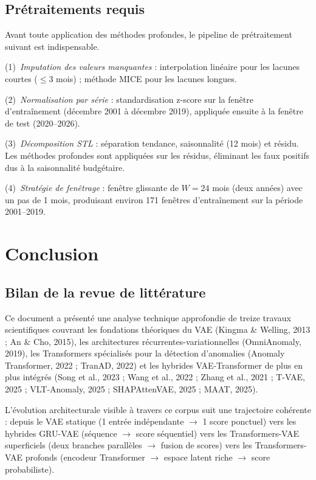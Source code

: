 \documentclass[12pt,a4paper]{article}
\begin{document}
\subsection{Prétraitements requis}

Avant toute application des méthodes profondes, le pipeline de prétraitement suivant est indispensable.

(1)~\textit{Imputation des valeurs manquantes} : interpolation linéaire pour les lacunes courtes ($\leq 3$ mois) ; méthode MICE pour les lacunes longues.

(2)~\textit{Normalisation par série} : standardisation z-score sur la fenêtre d'entraînement (décembre 2001 à décembre 2019), appliquée ensuite à la fenêtre de test (2020--2026).

(3)~\textit{Décomposition STL} : séparation tendance, saisonnalité (12 mois) et résidu. Les méthodes profondes sont appliquées sur les résidus, éliminant les faux positifs dus à la saisonnalité budgétaire.

(4)~\textit{Stratégie de fenêtrage} : fenêtre glissante de $W = 24$ mois (deux années) avec un pas de 1 mois, produisant environ 171 fenêtres d'entraînement sur la période 2001--2019.

\section{Conclusion}

\subsection{Bilan de la revue de littérature}

Ce document a présenté une analyse technique approfondie de treize travaux scientifiques couvrant les fondations théoriques du VAE (Kingma \& Welling, 2013 ; An \& Cho, 2015), les architectures récurrentes-variationnelles (OmniAnomaly, 2019), les Transformers spécialisés pour la détection d'anomalies (Anomaly Transformer, 2022 ; TranAD, 2022) et les hybrides VAE-Transformer de plus en plus intégrés (Song et al., 2023 ; Wang et al., 2022 ; Zhang et al., 2021 ; T-VAE, 2025 ; VLT-Anomaly, 2025 ; SHAPAttenVAE, 2025 ; MAAT, 2025).

L'évolution architecturale visible à travers ce corpus suit une trajectoire cohérente : depuis le VAE statique (1 entrée indépendante $\rightarrow$ 1 score ponctuel) vers les hybrides GRU-VAE (séquence $\rightarrow$ score séquentiel) vers les Transformers-VAE superficiels (deux branches parallèles $\rightarrow$ fusion de scores) vers les Transformers-VAE profonds (encodeur Transformer $\rightarrow$ espace latent riche $\rightarrow$ score probabiliste).
\end{document}
